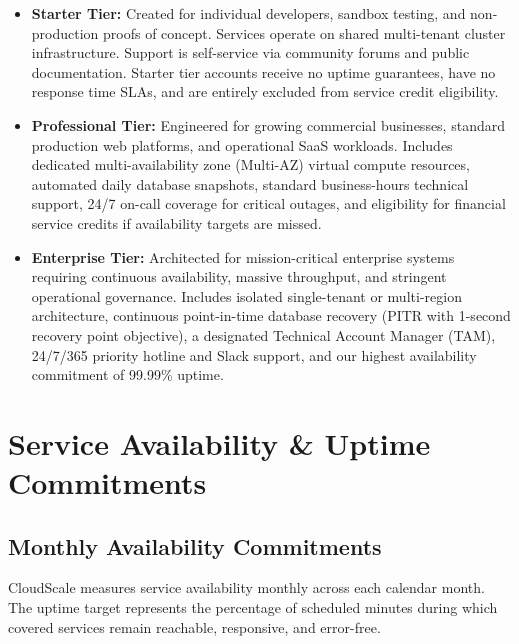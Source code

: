 \documentclass[10pt,letterpaper]{article}
\begin{document}
\begin{itemize}[leftmargin=1.5em, itemsep=2pt, topsep=1.5pt]
  \item \textbf{Starter Tier:} Created for individual developers, sandbox testing, and non-production proofs of concept. Services operate on shared multi-tenant cluster infrastructure. Support is self-service via community forums and public documentation. Starter tier accounts receive no uptime guarantees, have no response time SLAs, and are entirely excluded from service credit eligibility.
  \item \textbf{Professional Tier:} Engineered for growing commercial businesses, standard production web platforms, and operational SaaS workloads. Includes dedicated multi-availability zone (Multi-AZ) virtual compute resources, automated daily database snapshots, standard business-hours technical support, 24/7 on-call coverage for critical outages, and eligibility for financial service credits if availability targets are missed.
  \item \textbf{Enterprise Tier:} Architected for mission-critical enterprise systems requiring continuous availability, massive throughput, and stringent operational governance. Includes isolated single-tenant or multi-region architecture, continuous point-in-time database recovery (PITR with 1-second recovery point objective), a designated Technical Account Manager (TAM), 24/7/365 priority hotline and Slack support, and our highest availability commitment of 99.99\% uptime.
\end{itemize}

\newpage

\section{Service Availability \& Uptime Commitments}

\subsection{Monthly Availability Commitments}
CloudScale measures service availability monthly across each calendar month. The uptime target represents the percentage of scheduled minutes during which covered services remain reachable, responsive, and error-free.
\end{document}
